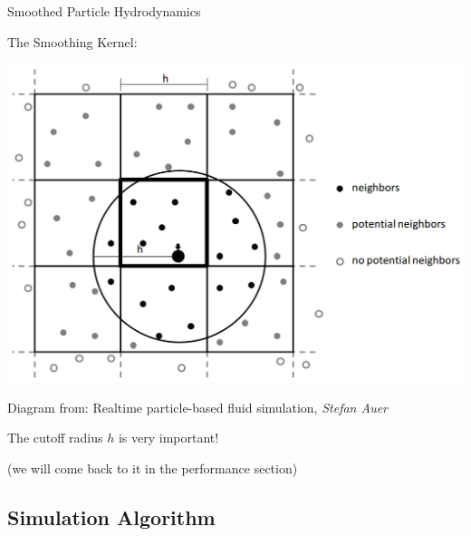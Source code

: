 \documentclass[12pt]{beamer}
\begin{document}

\begin{frame}[t]{Smoothed Particle Hydrodynamics}

\begin{block}{The Smoothing Kernel:}

\begin{center}
\includegraphics[scale=0.25]{Neighbours}

\color{white}
\tiny{Diagram from: Realtime particle-based fluid simulation, \textit{Stefan Auer}}
\end{center}

\small{\alert{The cutoff radius $h$ is very important!}}

\tiny{\color{white} (we will come back to it in the performance section)}

\end{block}

\end{frame}



\subsection{Simulation Algorithm}
\end{document}
